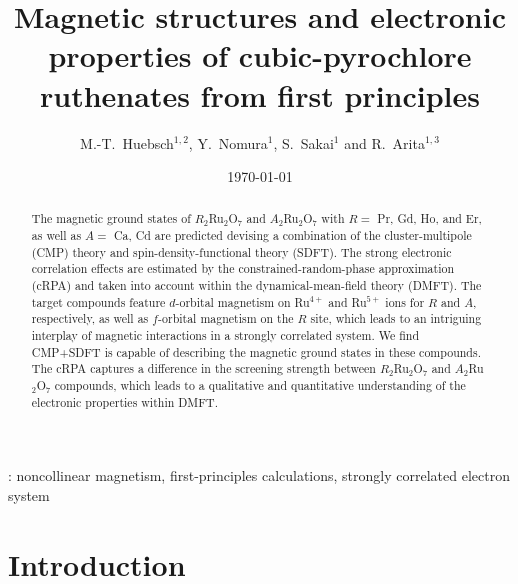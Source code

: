 \documentclass[10pt]{iopart}
\begin{document}
\title{Magnetic structures and electronic properties of cubic-pyrochlore ruthenates from first principles}
\author{M.-T.\ Huebsch$^{1,2}$, Y.\ Nomura$^1$, S.\ Sakai$^1$ and R.\ Arita$^{1,3}$}
\address{$^1$Center for Emergent Matter Science, RIKEN, Wako, Saitama 351-0198, Japan}
\address{$^2$VASP Software GmbH, Sensengasse 8/17, A-1090 Vienna, Austria}
\address{$^3$University of Tokyo, 7-3-1 Hongo, Bunkyo-ku, Tokyo 113-8656, Japan}
\date{\today}


\begin{abstract}
  The magnetic ground states of $R_2$Ru$_2$O$_7$ and $A_2$Ru$_2$O$_7$ with $R=$ Pr, Gd, Ho, and Er, as well as $A=$ Ca, Cd are predicted devising a combination of the cluster-multipole (CMP) theory and spin-density-functional theory (SDFT). The strong electronic correlation effects are estimated by the constrained-random-phase approximation (cRPA) and taken into account within the dynamical-mean-field theory (DMFT). 
  The target compounds feature $d$-orbital magnetism on Ru$^{4+}$ and Ru$^{5+}$ ions for $R$ and $A$, respectively, as well as $f$-orbital magnetism on the $R$ site, which leads to an intriguing interplay of magnetic interactions in a strongly correlated system. 
  We find CMP+SDFT is capable of describing the magnetic ground states in these compounds. 
  The cRPA captures a difference in the screening strength between $R_2$Ru$_2$O$_7$ and $A_2$Ru$_2$O$_7$ compounds, 
  which leads to a qualitative and quantitative understanding of the electronic properties within DMFT.
\end{abstract}

: noncollinear magnetism, first-principles calculations, strongly correlated electron system

\submitto{\JPCM}

\maketitle
\ioptwocol

\section{Introduction} \label{sec:Introduction}
\end{document}
